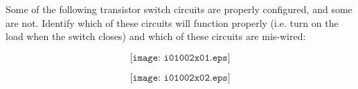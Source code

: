 

Some of the following transistor switch circuits are properly configured, and some are not.  Identify which of these circuits will function properly (i.e. turn on the load when the switch closes) and which of these circuits are mis-wired:

$$\texttt{[image: i01002x01.eps]}$$







$$\texttt{[image: i01002x02.eps]}$$











